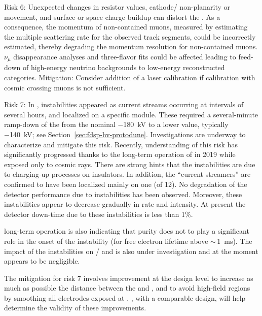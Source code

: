 Risk 6: Unexpected changes in  resistor values, cathode/ non-planarity or movement, and surface or space charge buildup can distort the \efield. As a consequence, the momentum of non-contained muons,  measured by estimating the multiple scattering rate for the observed track segments, could be incorrectly estimated, thereby degrading %
the momentum resolution for non-contained muons.  ${\nu}_{\mu}$ disappearance analyses and three-flavor fits could be affected %
leading to feed-down  of high-energy neutrino backgrounds to low-energy reconstructed categories.  Mitigation: Consider addition of a laser calibration %
if calibration with cosmic crossing muons is not sufficient. 

Risk 7:  In ,  instabilities appeared as current streams occurring at intervals of several hours, and localized on  a specific  module. These required a several-minute ramp-down of the  from the nominal \SI{-180}{kV} to a lower value, typically \SI{-140}{kV}; see Section~\ref{sec:fdsp-hv-protodune}.
Investigations are underway to characterize and mitigate this risk. Recently, understanding of this risk has significantly progressed thanks to the 
long-term operation of  in 2019 while exposed only to cosmic rays. 
There are strong hints %
that the instabilities are due to charging-up processes on insulators. In addition, %
the ``current streamers'' are confirmed to have been localized mainly on %
one  (of 12). No degradation of the detector performance due to  instabilities has been observed. %
Moreover, these instabilities appear to decrease gradually in rate and intensity. At present the detector down-time due to these instabilities is less than 1\%.  

 long-term operation is also indicating that  purity does not %
to play a significant role in the onset of the  instability (for free electron lifetime above $\sim\,$\SI{1}{ms}).  The impact of the  instabilities on / and  is also under investigation and at the moment appears to be negligible.

The mitigation for risk 7 involves improvement at the design level to increase as much as possible the distance between the  and , and to avoid high-field regions by smoothing all electrodes exposed at .  %
, with a comparable design, will help determine %
the validity of these improvements.

